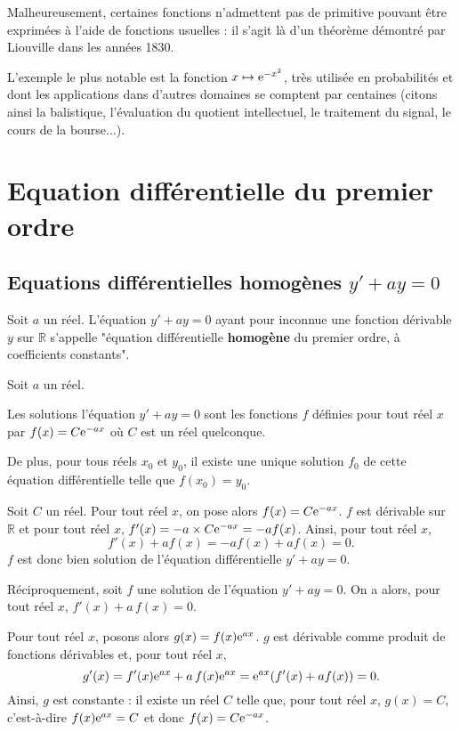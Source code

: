 \documentclass[11pt,fleqn, openany]{book} %
\begin{document}
Malheureusement, certaines fonctions n'admettent pas de primitive pouvant être exprimées à l'aide de fonctions usuelles : il s'agit là d'un théorème démontré par Liouville dans les années 1830.

L'exemple le plus notable est la fonction $x\mapsto \mathrm{e}^{-x^2}$, très utilisée en probabilités et dont les applications dans d'autres domaines se comptent par centaines (citons ainsi la balistique, l'évaluation du quotient intellectuel, le traitement du signal,  le cours de la bourse...).

\section{Equation différentielle  du premier ordre}

\subsection{Equations différentielles homogènes $y'+ay=0$}

\begin{definition}Soit $a$ un réel. L'équation $y'+ay=0$ ayant pour inconnue une fonction dérivable $y$ sur $\mathbb{R}$ s'appelle "équation différentielle \textbf{homogène} du premier ordre, à coefficients constants".\end{definition}

\begin{proposition}Soit $a$ un réel.

Les solutions l'équation $y'+ay=0$ sont les fonctions $f$ définies pour tout réel $x$ par $f(x)=C\mathrm{e}^{-ax}$ où $C$ est un réel quelconque.

De plus, pour tous réels $x_0$ et $y_0$, il existe une unique solution $f_0$ de cette équation différentielle telle que $f(x_0)=y_0$.\end{proposition}

\begin{demonstration} Soit $C$ un réel. Pour tout réel $x$, on pose alors $f(x)=C\mathrm{e}^{-ax}$. $f$ est dérivable sur $\mathbb{R}$ et pour tout réel $x$, $f'(x)=-a\times C\mathrm{e}^{-ax}=-af(x)$. Ainsi, pour tout réel $x$, \[f'(x)+af(x)=-af(x)+af(x)=0.\] $f$ est donc bien solution de l'équation différentielle $y'+ay=0$.

Réciproquement, soit $f$ une solution de l'équation $y'+ay=0$. On a alors, pour tout réel $x$, $f'(x)+a\,f(x)=0$.

Pour tout réel $x$, posons alors $g(x)=f(x)\mathrm{e}^{ax}$. $g$ est dérivable comme produit de fonctions dérivables et, pour tout réel $x$,
\[g'(x)=f'(x)\mathrm{e}^{ax}+a\,f(x) \mathrm{e}^{ax}=\mathrm{e}^{ax}(f'(x)+af(x))=0.\]
Ainsi, $g$ est constante : il existe un réel $C$ telle que, pour tout réel $x$, $g(x)=C$, c'est-à-dire $f(x)\mathrm{e}^{ax}=C$ et donc $f(x)=C\mathrm{e}^{-ax}$.\end{demonstration}
\end{document}
